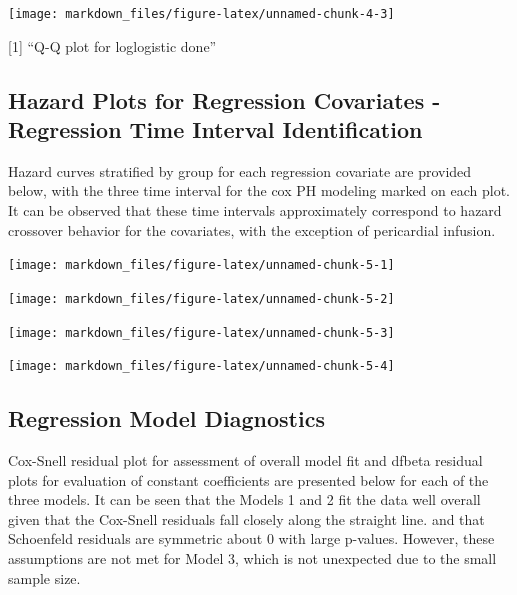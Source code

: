 \documentclass[
]{article}
\begin{document}
\begin{center}\texttt{[image: markdown\_files/figure-latex/unnamed-chunk-4-3]} \end{center}

{[}1{]} ``Q-Q plot for loglogistic done''

\hypertarget{hazard-plots-for-regression-covariates---regression-time-interval-identification}{%
\subsection{Hazard Plots for Regression Covariates - Regression Time
Interval
Identification}\label{hazard-plots-for-regression-covariates---regression-time-interval-identification}}

Hazard curves stratified by group for each regression covariate are
provided below, with the three time interval for the cox PH modeling
marked on each plot. It can be observed that these time intervals
approximately correspond to hazard crossover behavior for the
covariates, with the exception of pericardial infusion.

\begin{center}\texttt{[image: markdown\_files/figure-latex/unnamed-chunk-5-1]} \end{center}

\begin{center}\texttt{[image: markdown\_files/figure-latex/unnamed-chunk-5-2]} \end{center}

\begin{center}\texttt{[image: markdown\_files/figure-latex/unnamed-chunk-5-3]} \end{center}

\begin{center}\texttt{[image: markdown\_files/figure-latex/unnamed-chunk-5-4]} \end{center}

\newpage

\hypertarget{regression-model-diagnostics}{%
\subsection{Regression Model
Diagnostics}\label{regression-model-diagnostics}}

Cox-Snell residual plot for assessment of overall model fit and dfbeta
residual plots for evaluation of constant coefficients are presented
below for each of the three models. It can be seen that the Models 1 and
2 fit the data well overall given that the Cox-Snell residuals fall
closely along the straight line. and that Schoenfeld residuals are
symmetric about 0 with large p-values. However, these assumptions are
not met for Model 3, which is not unexpected due to the small sample
size.
\end{document}
